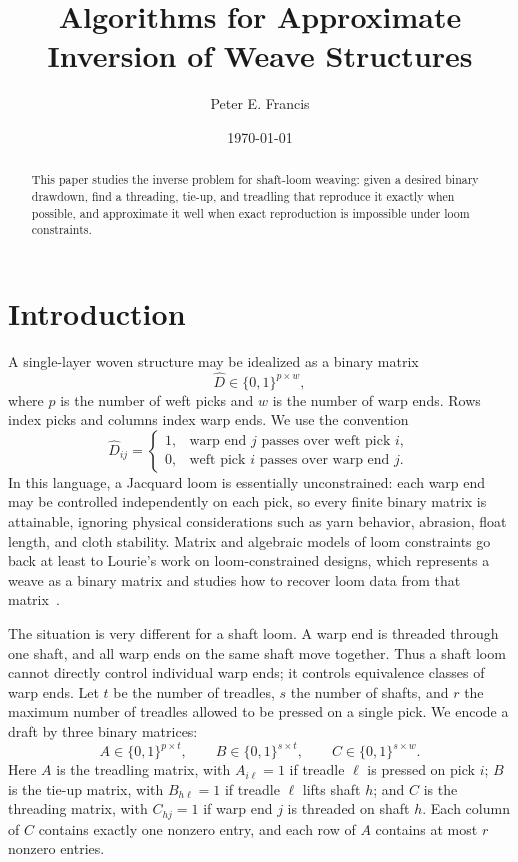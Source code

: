 \documentclass[11pt]{article}
\title{Algorithms for Approximate Inversion of Weave Structures}
\author{Peter E. Francis}
\date{\today}
\begin{document}
\maketitle

\begin{abstract}
This paper studies the inverse problem for shaft-loom weaving: given a desired
binary drawdown, find a threading, tie-up, and treadling that reproduce it
exactly when possible, and approximate it well when exact reproduction is
impossible under loom constraints.
\end{abstract}

\tableofcontents
\clearpage

\section{Introduction}

A single-layer woven structure may be idealized as a binary matrix
\[
  \widehat{D} \in \{0,1\}^{p \times w},
\]
where \(p\) is the number of weft picks and \(w\) is the number of warp ends.
Rows index picks and columns index warp ends. We use the convention
\[
  \widehat{D}_{ij}
  =
  \begin{cases}
    1, & \text{warp end } j \text{ passes over weft pick } i,\\
    0, & \text{weft pick } i \text{ passes over warp end } j.
  \end{cases}
\]
In this language, a Jacquard loom is essentially unconstrained: each warp end
may be controlled independently on each pick, so every finite binary matrix is
attainable, ignoring physical considerations such as yarn behavior, abrasion,
float length, and cloth stability. Matrix and algebraic models of loom
constraints go back at least to Lourie's work on loom-constrained designs, which
represents a weave as a binary matrix and studies how to recover loom data from
that matrix~\cite{lourie1969}.

The situation is very different for a shaft loom. A warp end is threaded through
one shaft, and all warp ends on the same shaft move together. Thus a shaft loom
cannot directly control individual warp ends; it controls equivalence classes of
warp ends. Let \(t\) be the number of treadles, \(s\) the number of shafts, and
\(r\) the maximum number of treadles allowed to be pressed on a single pick.
We encode a draft by three binary matrices:
\[
  A \in \{0,1\}^{p \times t},
  \qquad
  B \in \{0,1\}^{s \times t},
  \qquad
  C \in \{0,1\}^{s \times w}.
\]
Here \(A\) is the treadling matrix, with \(A_{i\ell}=1\) if treadle \(\ell\) is
pressed on pick \(i\); \(B\) is the tie-up matrix, with \(B_{h\ell}=1\) if
treadle \(\ell\) lifts shaft \(h\); and \(C\) is the threading matrix, with
\(C_{hj}=1\) if warp end \(j\) is threaded on shaft \(h\). Each column of \(C\)
contains exactly one nonzero entry, and each row of \(A\) contains at most \(r\)
nonzero entries.
\end{document}
